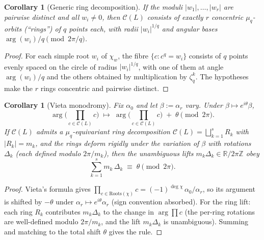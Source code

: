 \documentclass[11pt,a4paper]{article}
\theoremstyle{plain}
\newtheorem{corollary}[theorem]{Corollary}
\theoremstyle{definition}
\theoremstyle{remark}
\newcommand{\Roots}{\mathrm{Roots}}
\newcommand{\Cl}{\mathcal{C}}
\DeclareMathOperator{\arginline}{arg}
\begin{document}
\begin{corollary}[Generic ring decomposition]\label{cor:ring}
If the moduli $|w_1|, \dots, |w_r|$ are pairwise distinct and all
$w_i \ne 0$, then $\Cl(L)$ consists of exactly $r$ concentric
$\mu_q$-orbits (``rings'') of $q$ points each, with radii $|w_i|^{1/q}$
and angular bases $\arginline(w_i) / q \pmod{2\pi/q}$.
\end{corollary}

\begin{proof}
For each simple root $w_i$ of $\chi_w$, the fibre $\{c : c^q = w_i\}$
consists of $q$ points evenly spaced on the circle of radius
$|w_i|^{1/q}$, with one of them at angle $\arginline(w_i)/q$ and the others
obtained by multiplication by $\zeta_q^k$. The hypotheses make the
$r$ rings concentric and pairwise distinct.
\end{proof}

\begin{corollary}[Vieta monodromy]\label{cor:vieta}
Fix $\alpha_0$ and let $\beta := \alpha_r$ vary. Under $\beta \mapsto
e^{i\theta} \beta$,
\[
   \arginline\!\Big(\prod_{c \in \Cl(L)} c\Big)
   \;\longmapsto\;
   \arginline\!\Big(\prod_{c \in \Cl(L)} c\Big) \;+\; \theta \pmod{2\pi}.
\]
If $\Cl(L)$ admits a $\mu_q$-equivariant ring decomposition
$\Cl(L) = \bigsqcup_{k=1}^{s} R_k$ with $|R_k| = m_k$, and the rings deform
rigidly under the variation of $\beta$ with rotations $\Delta_k$ (each
defined modulo $2\pi / m_k$), then the unambiguous lifts $m_k \Delta_k \in
\mathbb{R}/2\pi\mathbb{Z}$ obey
\[
   \sum_{k=1}^{s} m_k\, \Delta_k \;\equiv\; \theta \pmod{2\pi}.
\]
\end{corollary}

\begin{proof}
Vieta's formula gives $\prod_{c \in \Roots(\chi)} c = (-1)^{\deg \chi}\,
\alpha_0 / \alpha_r$, so its argument is shifted by $-\theta$ under
$\alpha_r \mapsto e^{i\theta} \alpha_r$ (sign convention absorbed). For the
ring lift: each ring $R_k$ contributes $m_k \Delta_k$ to the change in
$\arginline \prod c$ (the per-ring rotations are well-defined modulo
$2\pi/m_k$, and the lift $m_k \Delta_k$ is unambiguous). Summing and
matching to the total shift $\theta$ gives the rule.
\end{proof}
\end{document}
